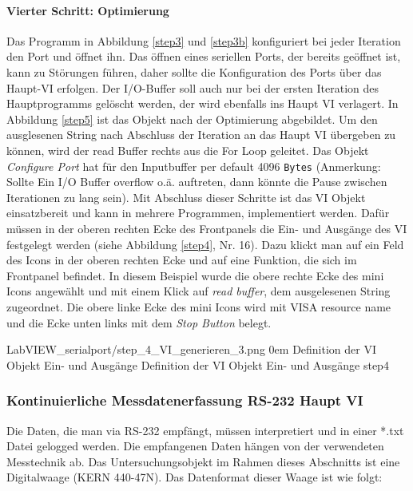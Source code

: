 \paragraph{Vierter Schritt: Optimierung} Das Programm in Abbildung \ref{step3} und \ref{step3b} konfiguriert bei jeder Iteration den Port und öffnet ihn. Das öffnen eines seriellen Ports, der bereits geöffnet ist, kann zu Störungen führen, daher sollte die Konfiguration des Ports über das Haupt-VI erfolgen. Der I/O-Buffer soll auch nur bei der ersten Iteration des Hauptprogramms gelöscht werden, der wird ebenfalls ins Haupt VI verlagert. In Abbildung \ref{step5} ist das Objekt nach der Optimierung abgebildet. Um den ausglesenen String nach Abschluss der Iteration an das Haupt VI übergeben zu können, wird der read Buffer rechts aus die For Loop geleitet. Das Objekt \textit{Configure Port} hat für den Inputbuffer per default 4096 \texttt{Bytes} (Anmerkung: Sollte Ein I/O Buffer overflow o.ä. auftreten, dann könnte die Pause zwischen Iterationen zu lang sein). Mit Abschluss dieser Schritte ist das VI Objekt einsatzbereit und kann in mehrere Programmen, implementiert werden. Dafür müssen in der oberen rechten Ecke des Frontpanels die Ein- und Ausgänge des VI festgelegt werden (siehe Abbildung \ref{step4}, Nr. 16). Dazu klickt man auf ein Feld des Icons in der oberen rechten Ecke und auf eine Funktion, die sich im Frontpanel befindet. In diesem Beispiel wurde die obere rechte Ecke des mini Icons angewählt und mit einem Klick auf \textit{read buffer}, dem ausgelesenen String zugeordnet. Die obere linke Ecke des mini Icons wird mit VISA resource name und die Ecke unten links mit dem \textit{Stop Button} belegt.

{LabVIEW_serialport/step_4_VI_generieren_3.png}
{0em}
{Definition der VI Objekt Ein- und Ausgänge}
{Definition der VI Objekt Ein- und Ausgänge}
{step4}


\subsubsection{Kontinuierliche Messdatenerfassung RS-232 Haupt VI}

Die Daten, die man via RS-232 empfängt, müssen interpretiert und in einer *.txt Datei gelogged werden. Die empfangenen Daten hängen von der verwendeten Messtechnik ab. Das Untersuchungsobjekt im Rahmen dieses Abschnitts ist eine Digitalwaage (KERN 440-47N). Das Datenformat dieser Waage ist wie folgt:

